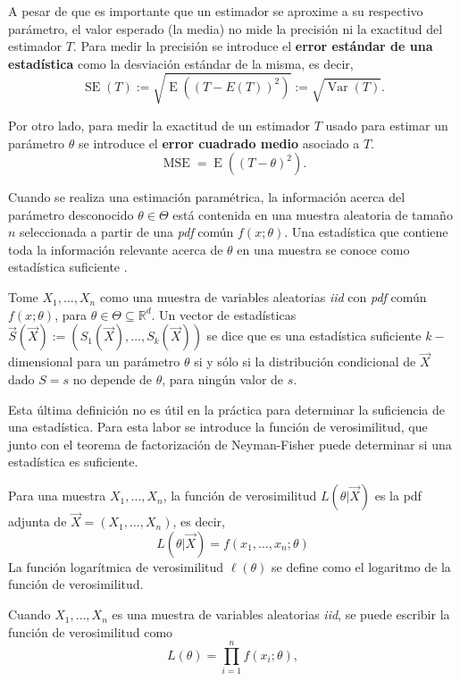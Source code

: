 	A pesar de que es importante que un estimador se aproxime a su respectivo parámetro, el valor esperado (la media) no mide la precisión ni la exactitud del estimador $T$. Para medir la precisión se introduce el \textbf{error estándar de una estadística} como la desviación estándar de la misma, es decir, 
	$$\mathop{SE}(T):=\sqrt{\mathop{E}((T-E(T))^2)}:=\sqrt{\mathop{Var}(T)}.$$
	
	Por otro lado, para medir la exactitud de un estimador $T$ usado para estimar un parámetro $\theta$ se introduce el \textbf{error cuadrado medio} asociado a $T$.
	$$\mathop{MSE(T;\theta)}=\mathop{E}((T-\theta)^2).$$
	
	Cuando se realiza una estimación paramétrica, la información acerca del parámetro desconocido $\theta\in\Theta$ está contenida en una muestra aleatoria de tamaño $n$ seleccionada a partir de una \textit{pdf} común $f(x;\theta)$. Una estadística que contiene toda la información relevante acerca de $\theta$ en una muestra se conoce como estadística suficiente \cite{rossi_2018}.
	
	\begin{defi}
		Tome $X_1,\dots,X_n$ como una muestra de variables aleatorias \textit{iid} con \textit{pdf} común $f(x;\theta)$, para $\theta\in\Theta\subseteq\mathbb{R}^d$. Un vector de estadísticas $\vec{S}(\vec{X}):=(S_1(\vec{X}),\dots, S_k(\vec{X}))$ se dice que es una estadística suficiente $k-$dimensional para un parámetro $\theta$ si y sólo si la distribución condicional de $\vec{X}$ dado $S=s$ no depende de $\theta$, para ningún valor de $s$.
	\end{defi}
		
		Esta última definición no es útil en la práctica para determinar la suficiencia de una estadística. Para esta labor se introduce la función de verosimilitud, que junto con el teorema de factorización de Neyman-Fisher puede determinar si una estadística es suficiente.
		\begin{defi}
			Para una muestra $X_1,\dots,X_n$, la función de verosimilitud $L(\theta|\vec{X})$ es la pdf adjunta de $\vec{X}=(X_1,\dots,X_n)$, es decir,
$$L(\theta|\vec{X})=f(x_1,\dots,x_n;\theta)$$			
			La función logarítmica de verosimilitud $\ell(\theta)$ se define como el logaritmo de la función de verosimilitud.
		\end{defi}
		Cuando $X_1,\dots,X_n$ es una muestra de variables aleatorias \textit{iid}, se puede escribir la función de verosimilitud como
		$$L(\theta)=\prod_{i=1}^n f(x_i;\theta),$$
		
